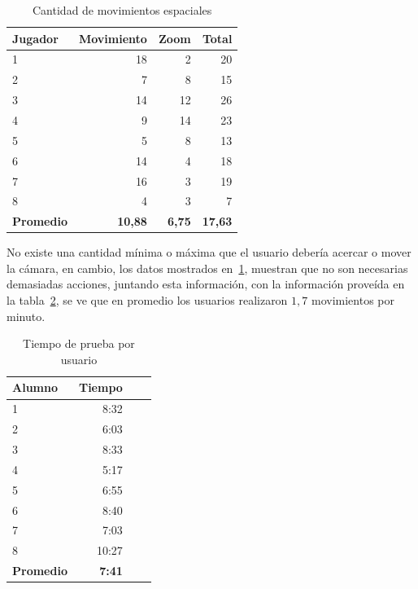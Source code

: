 \begin{table}[H]
\centering
\begin{tabular}{lrrr}
\toprule
\textbf{Jugador}  & \textbf{Movimiento} & \textbf{Zoom} & \textbf{Total} \\
\midrule
1        & 18         & 2    & 20 \\
2        & 7          & 8    & 15 \\
3        & 14         & 12   & 26 \\
4        & 9          & 14   & 23 \\
5        & 5          & 8    & 13 \\
6        & 14         & 4    & 18 \\
7        & 16         & 3    & 19 \\
8        & 4          & 3    &  7 \\
\midrule
\textbf{Promedio} & \textbf{10,88}      & \textbf{6,75} & \textbf{17,63} \\
\bottomrule
\end{tabular}
\caption{Cantidad de movimientos espaciales}
\label{tab:interfaz_cantidad_espaciales}
\end{table}

No existe una cantidad mínima o máxima que el usuario debería acercar o mover la
cámara, en cambio, los datos mostrados en~\ref{tab:interfaz_cantidad_espaciales},
muestran que no son necesarias demasiadas acciones, juntando esta información,
con la información proveída en la tabla~\ref{tab:interfaz_tiempo_total}, se ve
que en promedio los usuarios realizaron $1,7$ movimientos por minuto.

\begin{table}[!hbt]
\centering
\begin{tabular}{lrrr}
\toprule
\textbf{Alumno} & \textbf{Tiempo} \\
\midrule
1        & 8:32 \\
2        & 6:03 \\
3        & 8:33 \\
4        & 5:17 \\
5        & 6:55 \\
6        & 8:40 \\
7        & 7:03 \\
8        & 10:27 \\
\midrule
\textbf{Promedio} & \textbf{7:41} \\
\bottomrule
\end{tabular}
\caption{Tiempo de prueba por usuario}
\label{tab:interfaz_tiempo_total}
\end{table}

